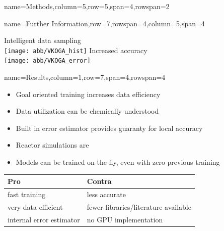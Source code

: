 \documentclass[
	accentcolor=3c,
	boxstyle=colored, %
	colorback=false,
	title=small
	]{tudasciposter}
\begin{document}
\begin{tcbposter}[
	poster={
		columns=8,
		rows=12,
		spacing=1cm,
	},]
\begin{posterboxenv}[title=2. Methods]{name=Methods,column=5,row=5,span=4,rowspan=2}
\end{posterboxenv}

\begin{posterboxenv}{name=Further Information,row=7,rowspan=4,column=5,span=4}
	\begin{multicols}{2}
		{\Large \centering Intelligent data sampling\\}
		\vspace{2cm}
		\texttt{[image: abb/VKOGA\_hist]}
		\columnbreak
		{\Large \centering Increased accuracy\\}
		\vspace{2cm}
		\texttt{[image: abb/VKOGA\_error]} %
	\end{multicols}	
\end{posterboxenv}

\begin{posterboxenv}[title=3. Results]{name=Results,column=1,row=7,span=4,rowspan=4}
	\begin{itemize}
		\item Goal oriented training increases data efficiency
		\item Data utilization can be chemically understood
		\item Built in error estimator provides guaranty for local accuracy
		\item Reactor simulations are 
		\item Models can be trained on-the-fly, even with zero previous training
	\end{itemize}
	\vspace{2cm}
	\begin{tabularx}{\textwidth}{XX}
		\toprule
		Pro & Contra \\ \midrule
		fast training & less accurate \\ 
		very data efficient & fewer libraries/literature available\\
		internal error estimator & no GPU implementation\\		
		\bottomrule
	\end{tabularx}%
	


\end{posterboxenv}


\end{tcbposter}
\end{document}
